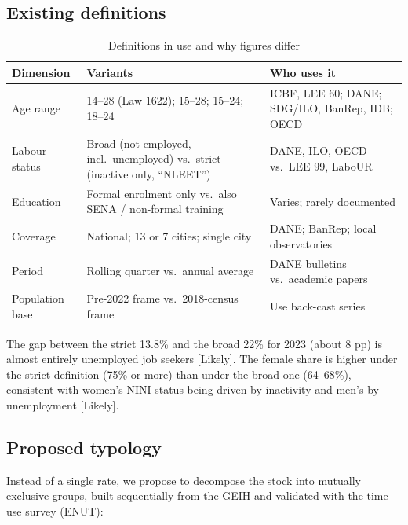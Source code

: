 \documentclass[11pt]{article}
\newcommand{\likely}{\textcolor{orange!80!black}{\textsf{\footnotesize[Likely]}}}
\begin{document}
\subsection{Existing definitions}

\begin{table}[htbp]
\centering\small
\caption{Definitions in use and why figures differ}\label{tab:defs}
\begin{tabularx}{\linewidth}{P{3.3cm}LP{4.2cm}}
\toprule
Dimension & Variants & Who uses it \\
\midrule
Age range & 14--28 (Law 1622); 15--28; 15--24; 18--24 & ICBF, LEE 60; DANE; SDG/ILO, BanRep, IDB; OECD \\
Labour status & Broad (not employed, incl.\ unemployed) vs.\ strict (inactive only, ``NLEET'') & DANE, ILO, OECD vs.\ LEE 99, LaboUR \\
Education & Formal enrolment only vs.\ also SENA / non-formal training & Varies; rarely documented \\
Coverage & National; 13 or 7 cities; single city & DANE; BanRep; local observatories \\
Period & Rolling quarter vs.\ annual average & DANE bulletins vs.\ academic papers \\
Population base & Pre-2022 frame vs.\ 2018-census frame & Use back-cast series \\
\bottomrule
\end{tabularx}
\end{table}

The gap between the strict 13.8\% \citep{lee99} and the broad 22\% for 2023 (about 8 pp) is almost entirely unemployed job seekers \likely. The female share is higher under the strict definition (75\% or more) than under the broad one (64--68\%), consistent with women's NINI status being driven by inactivity and men's by unemployment \likely.

\subsection{Proposed typology}

Instead of a single rate, we propose to decompose the stock into mutually exclusive groups, built sequentially from the GEIH and validated with the time-use survey (ENUT):
\end{document}
